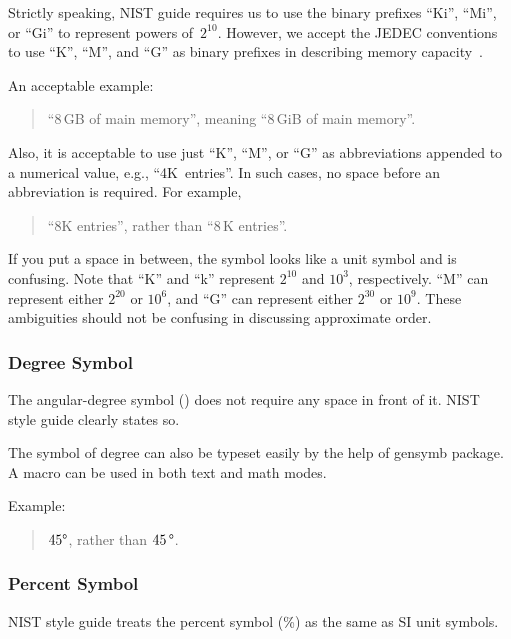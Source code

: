 Strictly speaking, NIST guide requires us to use the binary prefixes
``Ki'', ``Mi'', or ``Gi'' to represent powers of~$2^{10}$.
However, we accept the JEDEC conventions to use ``K'', ``M'',
and ``G'' as binary prefixes in describing memory
capacity~\cite{JEDEC:dict:prefixmega}.

An acceptable example:
\begin{quote}
  ``8\,GB of main memory'', meaning ``8\,GiB of main memory''.
\end{quote}

Also, it is acceptable to use just ``K'', ``M'', or ``G'' as abbreviations
appended to a numerical value, e.g., ``4K~entries''.
In such cases, no space before an abbreviation is required.
For example,

\begin{quote}
  ``8K entries'', rather than ``8\,K entries''.
\end{quote}

If you put a space in between, the symbol looks like a unit symbol and
is confusing.
Note that ``K'' and ``k'' represent $2^{10}$ and $10^3$, respectively.
``M'' can represent either $2^{20}$ or $10^6$, and ``G'' can represent
either $2^{30}$ or $10^9$.
These ambiguities should not be confusing in discussing approximate order.

\subsubsection{Degree Symbol}
\label{sec:app:styleguide:Degree Symbol}

The angular-degree symbol (\degree) does not require any space in front
of it.
NIST style guide clearly states so.

The symbol of degree can also be typeset easily by the help of gensymb
package.
A macro \qco{\\degree} can be used in both text and math modes.

Example:

\begin{quote}
  $45\degree$, rather than $45\,\degree$.
\end{quote}

\subsubsection{Percent Symbol}
\label{sec:app:styleguide:Percent Symbol}

NIST style guide treats the percent symbol (\%) as the same as SI unit
symbols.


